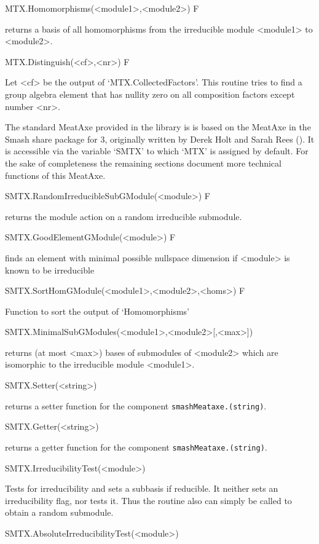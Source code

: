 \>MTX.Homomorphisms(<module1>,<module2>) F

returns a basis of all homomorphisms from the irreducible module 
<module1> to <module2>.

\>MTX.Distinguish(<cf>,<nr>) F

Let <cf> be the output of `MTX.CollectedFactors'. This routine
tries to find a group algebra element that has nullity zero on all
composition factors except number <nr>.


The standard MeatAxe provided in the {\GAP} library is
is based on the MeatAxe in the {\sf Smash} share
package for {\GAP}3, originally written by Derek Holt and Sarah Rees
(\cite{HR94}). It is
accessible via the variable `SMTX' to which `MTX' is assigned by default. 
For the sake of completeness the remaining sections document more technical
functions of this MeatAxe.

\>SMTX.RandomIrreducibleSubGModule(<module>) F

returns the module action on a random irreducible submodule.

\>SMTX.GoodElementGModule(<module>) F

finds an element with minimal possible nullspace dimension if <module>
is known to be irreducible

\>SMTX.SortHomGModule(<module1>,<module2>,<homs>) F

Function to sort the output of `Homomorphisms'

\>SMTX.MinimalSubGModules(<module1>,<module2>[,<max>])

returns (at most <max>) bases of submodules of <module2> which are
isomorphic to the irreducible module  <module1>.

\>SMTX.Setter(<string>)

returns a setter function for the component {\tt smashMeataxe.(string)}.

\>SMTX.Getter(<string>)

returns a getter function for the component {\tt smashMeataxe.(string)}.

\>SMTX.IrreducibilityTest(<module>)

Tests for irreducibility and sets a subbasis if reducible. It neither sets
an irreducibility flag, nor tests it. Thus the routine also can simply be
called to obtain a random submodule.

\>SMTX.AbsoluteIrreducibilityTest(<module>)

